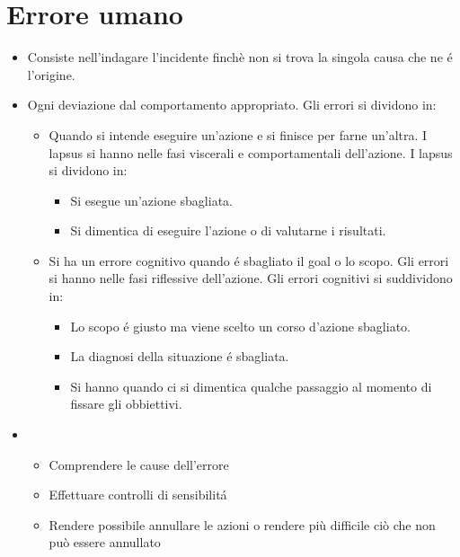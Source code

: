 \chapter{Errore umano}

\begin{itemize}
    \item {} Consiste nell'indagare l'incidente finch\`e non si trova la singola causa che ne \'e l'origine.
    \item {} Ogni deviazione dal comportamento appropriato. Gli errori si dividono in:
    \begin{itemize}
        \item {} Quando si intende eseguire un'azione e si finisce per farne un'altra. I lapsus si hanno nelle fasi viscerali e comportamentali dell'azione. I lapsus si dividono in:
        \begin{itemize}
            \item {} Si esegue un'azione sbagliata.
            \item {} Si dimentica di eseguire l'azione o di valutarne i risultati.
        \end{itemize}
        \item {} Si ha un errore cognitivo quando \'e sbagliato il goal o lo scopo. Gli errori si hanno nelle fasi riflessive dell'azione. Gli errori cognitivi si suddividono in:
        \begin{itemize}
            \item {} Lo scopo \'e giusto ma viene scelto un corso d'azione sbagliato.
            \item {} La diagnosi della situazione \'e sbagliata.
            \item {} Si hanno quando ci si dimentica qualche passaggio al momento di fissare gli obbiettivi.
        \end{itemize}
    \end{itemize}
    \item {}
    \begin{itemize}
        \item Comprendere le cause dell'errore
        \item Effettuare controlli di sensibilit\'a
        \item Rendere possibile annullare le azioni o rendere pi\`u difficile ci\`o che non pu\`o essere annullato

\end{itemize}
\end{itemize}
